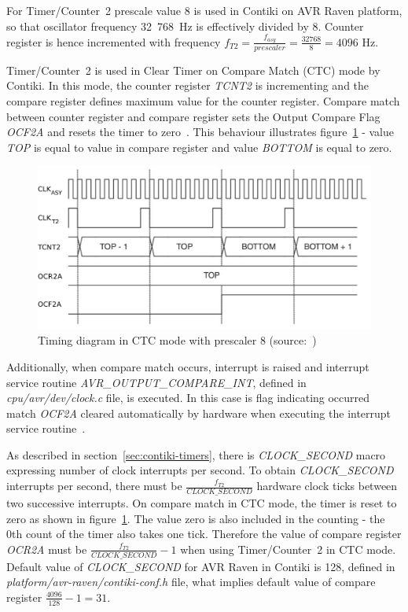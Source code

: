 For Timer/Counter~2 prescale value 8 is used in Contiki on AVR Raven platform,
so that oscillator frequency 32~768~Hz is effectively divided by 8.
Counter register is hence incremented with frequency
$f_{T2} = {\frac{f_{asy}}{prescaler}} = {\frac{32768}{8}} = 4096$ Hz.

Timer/Counter~2 is used in Clear Timer on Compare Match (CTC) mode by Contiki.
In this mode, the counter register {\it{TCNT2}} is incrementing
and the compare register defines maximum value for the counter register.
Compare match between counter register and compare register
sets the Output Compare Flag {\it{OCF2A}} and resets the timer to zero~\cite{avr-datasheet}.
This behaviour illustrates figure~\ref{fig:design-timing-diagram}
- value {\it{TOP}} is equal to value in compare register and value {\it{BOTTOM}} is equal to zero.

\begin{figure}
  \centering
  \includegraphics[width=12cm,keepaspectratio]{fig/timing-diagram.pdf}
  \caption{Timing diagram in CTC mode with prescaler 8 (source:~\cite{avr-datasheet})}
  \label{fig:design-timing-diagram}
  \bigskip
\end{figure}

Additionally, when compare match occurs,
interrupt is raised and interrupt service routine {\it{AVR\_OUTPUT\_COMPARE\_INT}},
defined in {\it{cpu/avr/dev/clock.c}} file, is executed.
In this case is flag indicating occurred match {\it{OCF2A}}
cleared automatically by hardware when executing
the interrupt service routine~\cite{avr-datasheet}.

As described in section~\ref{sec:contiki-timers}, there is
{\it{CLOCK\_SECOND}} macro expressing number of clock interrupts per second.
To obtain {\it{CLOCK\_SECOND}} interrupts per second, there must be
${\frac{f_{T2}}{CLOCK\_SECOND}}$ hardware clock ticks between two successive interrupts.
On compare match in CTC mode, the timer is reset to zero as
shown in figure~\ref{fig:design-timing-diagram}.
The value zero is also included in the counting - the 0th count of the timer also takes one tick.
Therefore the value of compare register {\it{OCR2A}} must be ${\frac{f_{T2}}{CLOCK\_SECOND}} - 1$
when using Timer/Counter~2 in CTC mode.
Default value of {\it{CLOCK\_SECOND}} for AVR Raven in Contiki is 128,
defined in {\it{platform/avr-raven/contiki-conf.h}} file,
what implies default value of compare register ${\frac{4096}{128}} - 1 = 31$.


